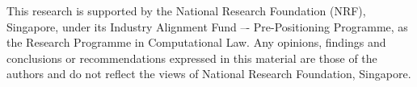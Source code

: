 \documentclass{tlp}
\begin{document}
This research is supported by the National Research Foundation (NRF),
Singapore, under its Industry Alignment Fund –- Pre-Positioning Programme, as
the Research Programme in Computational Law. Any opinions, findings and
conclusions or recommendations expressed in this material are those of the
authors and do not reflect the views of National Research Foundation,
Singapore.





\newpage
\appendix




\end{document}

